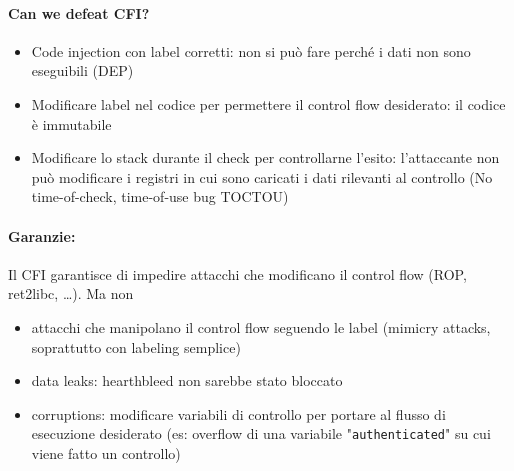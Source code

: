 \paragraph{Can we defeat CFI?}
\begin{itemize}
	\item Code injection con label corretti: non si può fare perché i dati non sono eseguibili (DEP)
	
    \item Modificare label nel codice per permettere il control flow desiderato: il codice è immutabile
	
    \item Modificare lo stack durante il check per controllarne l'esito: l'attaccante non può modificare i registri in cui sono caricati i dati rilevanti al controllo (No time-of-check, time-of-use bug TOCTOU)
\end{itemize} 

\paragraph{Garanzie:} Il CFI garantisce di impedire attacchi che modificano il control flow (ROP, ret2libc, \dots). Ma non 
\begin{itemize}
	\item attacchi che manipolano il control flow seguendo le label (mimicry attacks, soprattutto con labeling semplice)

	\item data leaks: hearthbleed non sarebbe stato bloccato

	\item corruptions: modificare variabili di controllo per portare al flusso di esecuzione desiderato (es: overflow di una variabile "\texttt{authenticated}" su cui viene fatto un controllo)
\end{itemize}
